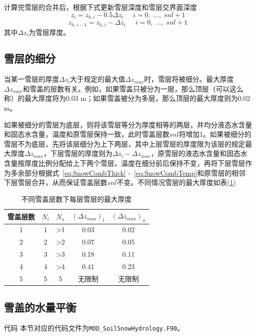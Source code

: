 计算完雪层的合并后，根据下式更新雪层深度和雪层交界面深度
\begin{equation}
    z_i=z_{h,i}-0.5\Delta z_i \;\;\;\;\;i=0,\;...,\;snl+1
\end{equation}
\begin{equation}
    z_{h,i-1}=z_{h,i}-\Delta z_i \;\;\;\;\;i=0,\;...,\;snl+1
\end{equation}
其中$\Delta z_i$为雪层厚度。



\subsection{雪层的细分}
当某一雪层的厚度$\Delta z_i$大于规定的最大值$\Delta z_{max}$时，雪层将被细分。最大厚度$\Delta z_{max}$和雪盖的层数有关。例如，如果雪盖只被分为一层，那么顶层（可以这么称）的最大厚度将为0.03 \unit{m}；如果雪盖被分为多层，那么顶层的最大厚度则为0.02 \unit{m}。

如果被细分的雪层为底层，则将该雪层等分为厚度相等的两层，并均分液态水含量和固态水含量，温度和原雪层保持一致，此时雪盖层数$snl$将增加1。如果被细分的雪层不为底层，先将该层细分为上下两层，其中上层雪层的厚度限为该层的规定最大厚度$\Delta z_{max}$，下层雪层的厚度则为$\Delta z_i - \Delta z_{max}$，原雪层的液态水含量和固态水含量按厚度比例分配给上下两个雪层，温度在细分前后保持不变，再将下层雪层作为多余部分根据式~\eqref{eq:SnowCombThick} -~\eqref{eq:SnowCombTemp}和原雪层的相邻下层雪层合并，从而保证雪盖层数$snl$不变。不同情况雪层的最大厚度如表(\ref{lab:雪层最大厚度})

\begin{table}[!ht]
    \centering
    \caption{不同雪盖层数下每层雪层的最大厚度}
    \begin{tabular}{|c|c|c|c|c|}
    \hline
        雪盖层数 & $N_{l}$ & $N_{u}$ & $(\Delta z_{max})_{l}$ & $(\Delta z_{max})_{u}$ \\ \hline
        1 & 1 & >1 & 0.03 & 0.02 \\ \hline
        2 & 2 & >2 & 0.07 & 0.05 \\ \hline
        3 & 3 & >3 & 0.18 & 0.11 \\ \hline
        4 & 4 & >4 & 0.41 & 0.23 \\ \hline
        5 & 5 & 5 & 无限制 & 无限制 \\ \hline
    \end{tabular}
    \label{lab:雪层最大厚度}
\end{table}


\subsection{雪盖的水量平衡}
\begin{mymdframed}{代码}
本节对应的代码文件为\texttt{MOD\_SoilSnowHydrology.F90}。
\end{mymdframed}

